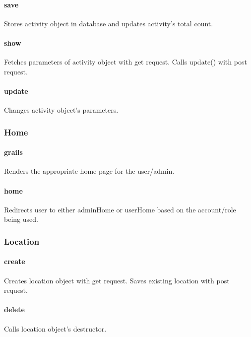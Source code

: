 \documentclass[12pt]{article}
\begin{document}
\paragraph{save} Stores activity object in database and updates activity's total count.
\paragraph{show} Fetches parameters of activity object with get request. Calls update() with post request.
\paragraph{update} Changes activity object's parameters.

\subsubsection{Home}\label{sec:CHome}
\paragraph{grails} Renders the appropriate home page for the user/admin.
\paragraph{home} Redirects user to either adminHome or userHome based on the account/role being used.

\subsubsection{Location}\label{sec:CLocation}
\paragraph{create} Creates location object with get request. Saves existing location with post request.
\paragraph{delete} Calls location object's destructor.
\end{document}
